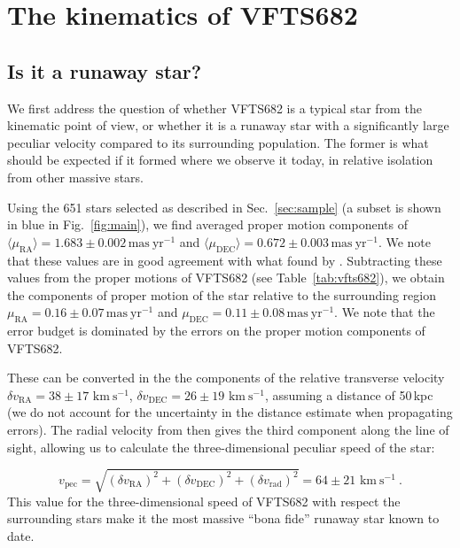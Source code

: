 \documentclass{aa}
\newcommand{\kms}{{\,\mathrm{km\ s^{-1}}}}
\DeclareRobustCommand{\Figref}[1]{Fig.~\ref{#1}}
\DeclareRobustCommand{\Tabref}[1]{Table~\ref{#1}}
\DeclareRobustCommand{\Secref}[1]{Sec.~\ref{#1}}
\begin{document}
{\section{The kinematics of VFTS682}
\label{sec:results}

\subsection{Is it a runaway star?}
\label{sec:runaway}
We first address the question of whether VFTS682 is a typical star
from the kinematic point of view, or whether it is a runaway star with
a significantly large peculiar velocity compared to its surrounding population. The former is what should
be expected if it formed where we observe it today, in relative
isolation from other massive stars.

Using the 651 stars selected as described in \Secref{sec:sample} (a
subset is shown in blue in \Figref{fig:main}), we find averaged proper motion components of
$\langle\mu_\mathrm{RA}\rangle = 1.683\pm0.002\,\mathrm{mas\ yr^{-1}}$ and
$\langle\mu_\mathrm{DEC}\rangle =
0.672\pm0.003\,\mathrm{mas\ yr^{-1}}$. We note that these values are
in good agreement with what found by \cite{lennon:18}. Subtracting these values from the
proper motions of VFTS682 (see \Tabref{tab:vfts682}), we obtain the
components of proper motion of the star relative to the surrounding region
$\mu_\mathrm{RA} = 0.16\pm 0.07\,\mathrm{mas\ yr^{-1}}$ and $\mu_\mathrm{DEC} =
0.11\pm 0.08\,\mathrm{mas\ yr^{-1}}$. We note that the error budget is
dominated by the errors on the proper motion components of VFTS682.

These can be converted in the
the components of the relative transverse velocity $\delta v_\mathrm{RA}=38\pm17\,\kms$,
$\delta v_\mathrm{DEC}=26\pm19\,\kms$, assuming a distance of
50\,kpc (we do not account for the uncertainty in the distance
estimate when propagating errors). The radial velocity from
\cite{bestenlehner:11} then gives the third component along
the line of sight, allowing us to calculate the three-dimensional
peculiar speed of the star:

\begin{equation}
  \label{eq:speed_around}
  v_\mathrm{pec} = \sqrt{\left(\delta v_\mathrm{RA}\right)^2
    +\left(\delta v_\mathrm{DEC}\right)^2+\left(\delta
      v_\mathrm{rad}\right)^2} = 64 \pm 21 
  \, \kms \ .
\end{equation}
This value for the three-dimensional speed of VFTS682 with respect the
surrounding stars make it the most massive ``bona fide'' runaway star
known to date.

}
\end{document}
